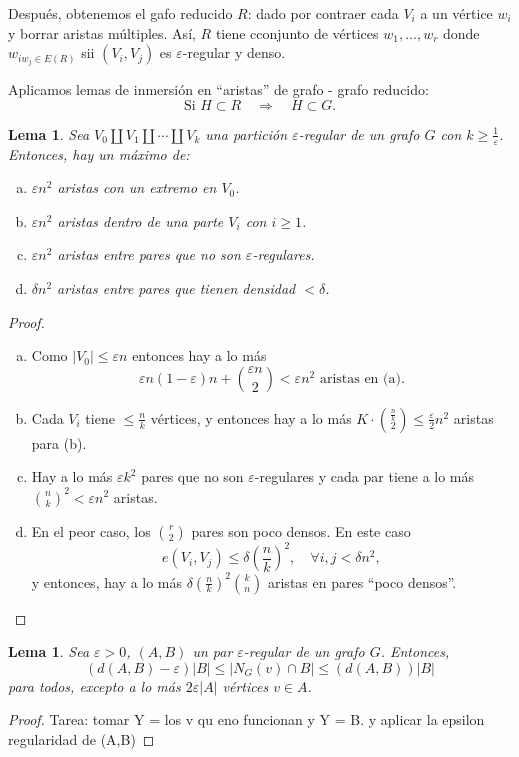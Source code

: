 \documentclass[12pt]{report}
\theoremstyle{plain}
\newtheorem{lemma}[theorem]{Lema}
\theoremstyle{definition}
\newcommand{\abs}[1]{\left \vert #1 \right \vert}
\begin{document}
Después, obtenemos el gafo reducido $R$: dado por contraer cada $V_i$ a un vértice $w_i$ y borrar aristas múltiples. Así, $R$ tiene cconjunto de vértices $w_1, \ldots, w_r$ donde $w_{iw_j \in E(R)}$ sii $(V_i, V_j)$ es $\varepsilon$-regular y denso.

Aplicamos lemas de inmersión en ``aristas'' de grafo - grafo reducido:
\[
    \text{Si $H \subset R$} \quad \Rightarrow \quad H \subset G.
\]

\begin{lemma}\label{lema:regularidad de szemeredi - lema 1}
Sea $V_0 \coprod V_1 \coprod \cdots \coprod V_k$ una partición $\varepsilon$-regular de un grafo $G$ con $k \geq \frac 1 \varepsilon$. Entonces, hay un máximo de:
\begin{enumerate}[(a)]
\item $\varepsilon n^2$ aristas con un extremo en $V_0$.
\item $\varepsilon n^2$ aristas dentro de una parte $V_i$ con $i\geq 1$.
\item $\varepsilon n^2$ aristas entre pares que no son $\varepsilon$-regulares.
\item $\delta n^2$ aristas entre pares que tienen densidad $< \delta$.
\end{enumerate}
\end{lemma}
\begin{proof}
\begin{enumerate}[(a)]
\item Como $\abs{V_0} \leq \varepsilon n$ entonces hay a lo más
\[
    \varepsilon n (1-\varepsilon) n + \binom{\varepsilon n}{2} < \varepsilon n^2 \text{ aristas en (a)}.
\]
\item Cada $V_i$ tiene $\leq \frac n k$ vértices, y entonces hay a lo más $K \cdot \binom{\frac n k}{2} \leq \frac \varepsilon 2 n^2$ aristas para (b).
\item Hay a lo más $\varepsilon k^2$ pares que no son $\varepsilon$-regulares y cada par tiene a lo más $\binom n k ^2 < \varepsilon n^2$ aristas.
\item En el peor caso, los $\binom r 2$ pares son poco densos. En este caso
\[
    e(V_i, V_j) \leq \delta \left ( \frac n k \right )^2, \quad \forall i, j < \delta n^2,
\]
y entonces, hay a lo más $\delta \left ( \frac n k \right )^2 \binom k n$ aristas en pares ``poco densos''.
\end{enumerate}
\end{proof}

\begin{lemma}\label{lema:regularidad de szemeredi - lema 2}
Sea $\varepsilon > 0$, $(A,B)$ un par $\varepsilon$-regular de un grafo $G$. Entonces,
\[
    \left ( d(A,B) - \varepsilon \right ) \abs B \leq \abs{N_G (v) \cap B} \leq \left ( d(A,B) \right ) \abs B
\]
para todos, excepto a lo más $2 \varepsilon \abs A$ vértices $v \in A$.
\end{lemma}
\begin{proof}
Tarea: tomar Y = los v qu eno funcionan y Y = B. y aplicar la epsilon regularidad de (A,B)
\end{proof}
\end{document}
